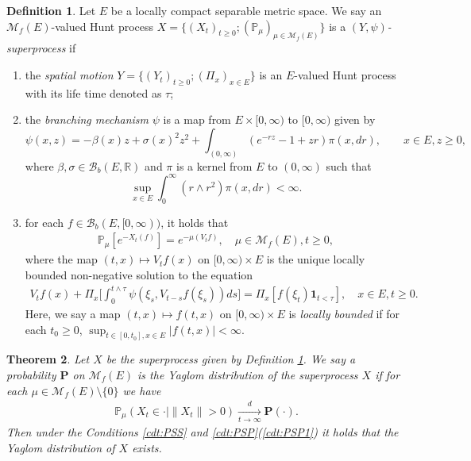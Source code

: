 \documentclass[12pt,a4paper]{amsart}
\numberwithin{equation}{section}
\theoremstyle{plain}
\newtheorem{thm}{Theorem}[section]
\theoremstyle{definition}
\newtheorem{defi}[thm]{Definition}
\begin{document}
\begin{defi}
  \label{def:IRS}
Let $E$ be a locally compact separable metric space. 
We say an $\mathcal M_f(E)$-valued Hunt process $X= \{(X_t)_{t\geq 0}; (\mathbb P_\mu)_{\mu\in \mathcal M_f(E)}\}$ is a \emph{$(Y,\psi)$-superprocess} if
\begin{enumerate}
\item
\label{def:IRS1}
  the \emph{spatial motion} $Y=\{(Y_t)_{t\geq 0};(\Pi_x)_{x\in E}\}$ is an $E$-valued Hunt process with its life time denoted as $\tau$;
\item
  \label{def:IRS2}
  the \emph{branching mechanism} $\psi$ is a map from $E\times[0,\infty)$ to $[0,\infty)$ given by
  \[
    \psi(x,z)
    =-\beta(x)z + \sigma(x)^2 z^2+ \int_{(0,\infty)} (e^{-rz}-1+zr ) \pi(x, dr),\qquad x\in E, z\geq0,
  \]
  where $\beta, \sigma\in \mathcal B_b(E,\mathbb R)$ and $\pi$ is a kernel from $E$ to $(0,\infty)$ such that
  \[
    \sup_{x\in E}\int_0^\infty (r\wedge r^2)\pi(x,dr)
    <\infty.
  \]
\item
  \label{def:IRS3}
  for each $f\in \mathcal B_b(E,[0,\infty))$, it holds that
  \begin{align}
    \mathbb P_\mu [e^{- X_t(f)}] = e^{-\mu(V_tf)},
    \quad \mu \in \mathcal M_f(E),t\geq 0,
  \end{align}
  where the map $(t,x) \mapsto V_tf(x)$ on $[0,\infty) \times E$ is the unique locally bounded non-negative solution to the equation
  \begin{align}
    V_t f(x) +   \Pi_x\Big[\int_0^{t\wedge \tau} \psi (\xi_s,V_{t-s} f(\xi_s)) ds\Big]
    = \Pi_x[f(\xi_t) \mathbf 1_{t < \tau}],
    \quad x \in E, t \geq 0.
  \end{align}
  Here, we say a map $(t,x) \mapsto f(t,x)$ on $[0,\infty)\times E$ is \emph{locally bounded} if for each $t_0 \geq 0$, $\sup_{t\in [0,t_0], x\in E} |f(t,x)| < \infty$.
\end{enumerate}
\end{defi}

\begin{thm}
  \label{thm:IRY}
	Let $X$ be the superprocess given by Definition \ref{def:IRS}. 
  We say a probability ${\mathbf P}$ on $\mathcal M_f(E)$ is the \emph{Yaglom distribution} of the superprocess $X$ if for each $\mu\in \mathcal M_f(E)\setminus\{0\}$ we have
  \begin{align}
    \mathbb P_\mu(X_t \in \cdot | \|X_t\|>0) 
    \xrightarrow[t\to \infty]{d} {\mathbf P}(\cdot).
  \end{align}
  Then under the Conditions \ref{cdt:PSS} and \ref{cdt:PSP}(\ref{cdt:PSP1}) it holds that the Yaglom distribution of $X$ exists.
\end{thm}
\end{document}
